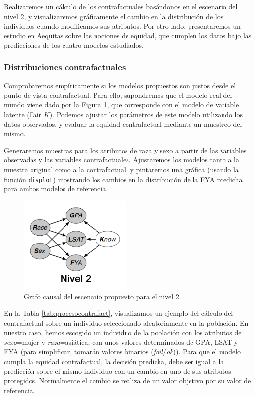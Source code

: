 \documentclass[oneside,openright,titlepage,numbers=noenddot,openany,headinclude,footinclude=true,
cleardoublepage=empty,abstractoff,BCOR=5mm,paper=a4,fontsize=12pt,main=spanish]{scrreprt}
\begin{document}
Realizaremos un cálculo de los contrafactuales basándonos en el escenario del nivel 2, y visualizaremos gráficamente el cambio en la distribución de los individuos cuando modificamos sus atributos. Por otro lado, presentaremos un estudio en Aequitas sobre las nociones de equidad, que cumplen los datos bajo las predicciones de los cuatro modelos estudiados.

\subsubsection{Distribuciones contrafactuales} \label{subsec:graficas}

Comprobaremos empíricamente si los modelos propuestos son justos desde el punto de vista contrafactual. Para ello, supondremos que el modelo real del mundo viene dado por la Figura \ref{fig:nivel2solo}, que corresponde con el modelo de variable latente (Fair $K$). Podemos ajustar los parámetros de este modelo utilizando los datos observados, y evaluar la equidad contrafactual mediante un muestreo del mismo. 

Generaremos muestras para los atributos de raza y sexo a partir de las variables observadas y las variables contrafactuales. Ajustaremos los modelos tanto a la muestra original como a la contrafactual, y pintaremos una gráfica (usando la función \texttt{displot}) mostrando los cambios en la distribución de la FYA predicha para ambos modelos de referencia.\\

\begin{figure}[h]
	\centering
	\includegraphics[width=5.5cm]{nivel2grafo.png}
	\caption{Grafo causal del escenario propuesto para el nivel 2.}
    \label{fig:nivel2solo}
\end{figure}

En la Tabla \ref{tab:procesocontrafact}, visualizamos un ejemplo del cálculo del contrafactual sobre un individuo seleccionado aleatoriamente en la población. En nuestro caso, hemos escogido un individuo de la población con los atributos de \textit{sexo}=mujer y \textit{raza}=asiática, con unos valores determinados de GPA, LSAT y FYA (para simplificar, tomarán valores binarios (\textit{fail}/\textit{ok})). Para que el modelo cumpla la equidad contrafactual, la decisión predicha, debe ser igual a la predicción sobre el mismo individuo con un cambio en uno de sus atributos protegidos. Normalmente el cambio se realiza de un valor objetivo por su valor de referencia.\\
\end{document}

